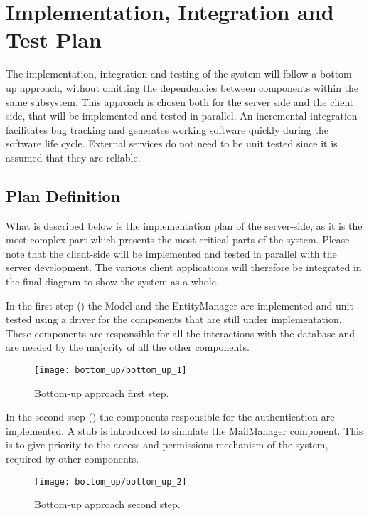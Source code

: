 \chapter{Implementation, Integration and Test Plan}
The implementation, integration and testing of the system will follow a bottom-up approach, without omitting the dependencies between components within the same subsystem. This approach is chosen both for the server side and the client side, that will be implemented and tested in parallel. An incremental integration facilitates bug tracking and generates working software quickly during the software life cycle.\newline
External services do not need to be unit tested since it is assumed that they are reliable.

\section{Plan Definition}
What is described below is the implementation plan of the server-side, as it is the most complex part which presents the most critical parts of the system.\newline
Please note that the client-side will be implemented and tested in parallel with the server development. The various client applications will therefore be integrated in the final diagram to show the system as a whole.

In the first step () the Model and the EntityManager are implemented and unit tested using a driver for the components that are still under implementation. These components are responsible for all the interactions with the database and are needed by the majority of all the other components.
\begin{figure}[H]
	\centering
	\texttt{[image: bottom\_up/bottom\_up\_1]}
	\caption{Bottom-up approach first step.}
	\label{fig:bottom_up_1}
\end{figure}

In the second step () the components responsible for the authentication are implemented. A stub is introduced to simulate the MailManager component. This is to give priority to the access and permissions mechanism of the system, required by other components.
\begin{figure}[H]
	\centering
	\texttt{[image: bottom\_up/bottom\_up\_2]}
	\caption{Bottom-up approach second step.}
	\label{fig:bottom_up_2}
\end{figure}


